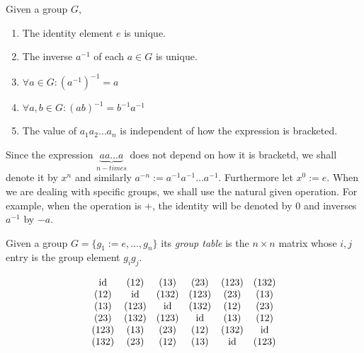 \begin{proposition}
   Given a group \(G\),
   \begin{enumerate}[label=\roman*, align=Center]
      \item The identity element \(e\) is unique.
      \item The inverse \(a^{-1}\) of each \(a \in G\) is unique.
      \item \(\forall a \in G: (a^{-1})^{-1} = a\)
      \item \(\forall a, b \in G: (ab)^{-1} = b^{-1}a^{-1}\)
      \item The value of \(a_1a_2\ldots a_n\) is independent of how the expression is bracketed.
   \end{enumerate}
\end{proposition}
\begin{remark}[Notation]
   Since the expression \(\underbrace{a a \ldots a}_{n-times}\) does not depend on how it is bracketd, we shall denote it by \(x^n\) and similarly \(a^{-n} := a^{-1} a^{-1} \ldots a^{-1}\).
   Furthermore let \(x^0 := e\).
   When we are dealing with specific groups, we shall use the natural given operation.
   For example, when the operation is \(+\), the identity will be denoted by 0 and inverses \(a^{-1}\) by \(-a\).
\end{remark}

\begin{definition}
   Given a group \(G = \{g_1 := e, \ldots, g_n\}\) its \emph{group table} is the \(n \times n\) matrix whose \(i,j\) entry is the group element \(g_ig_j\).
\end{definition}
\begin{example}
   \[\begin{matrix}
         \operatorname{id}  & (12)  & (13)  & (23)  & (123) & (132) \\
         (12) & \operatorname{id}   & (132) & (123) & (23)  & (13)  \\
         (13) & (123) & \operatorname{id}   & (132) & (12)  & (23)  \\
         (23) & (132) & (123) & \operatorname{id}   & (13)  & (12)  \\
         (123) & (13) & (23) & (12)   & (132) & \operatorname{id}   \\
         (132) & (23) & (12) & (13)   & \operatorname{id}   & (123) \\
   \end{matrix}\]
\end{example}

